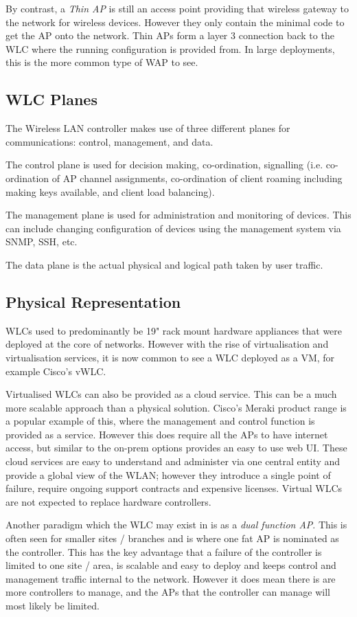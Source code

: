 By contrast, a \textit{Thin AP} is still an access point providing that wireless gateway to the network for wireless devices. However they only contain the minimal code to get the AP onto the network. Thin APs form a layer 3 connection back to the WLC where the running configuration is provided from. In large deployments, this is the more common type of WAP to see. 

\subsection{WLC Planes}
The Wireless LAN controller makes use of three different planes for communications: control, management, and data.

The control plane is used for decision making, co-ordination, signalling (i.e. co-ordination of AP channel assignments, co-ordination of client roaming including making keys available, and client load balancing).

The management plane is used for administration and monitoring of devices. This can include changing configuration of devices using the management system via SNMP, SSH, etc. 

The data plane is the actual physical and logical path taken by user traffic.

\subsection{Physical Representation}
WLCs used to predominantly be 19" rack mount hardware appliances that were deployed at the core of networks. However with the rise of virtualisation and virtualisation services, it is now common to see a WLC deployed as a VM, for example Cisco's vWLC.

Virtualised WLCs can also be provided as a cloud service. This can be a much more scalable approach than a physical solution. Cisco's Meraki product range is a popular example of this, where the management and control function is provided as a service. However this does require all the APs to have internet access, but similar to the on-prem options provides an easy to use web UI. These cloud services are easy to understand and administer via one central entity and provide a global view of the WLAN; however they introduce a single point of failure, require ongoing support contracts and expensive licenses. Virtual WLCs are not expected to replace hardware controllers.

Another paradigm which the WLC may exist in is as a \textit{dual function AP}. This is often seen for smaller sites / branches and is where one fat AP is nominated as the controller. This has the key advantage that a failure of the controller is limited to one site / area, is scalable and easy to deploy and keeps control and management traffic internal to the network. However it does mean there is are more controllers to manage, and the APs that the controller can manage will most likely be limited. 

